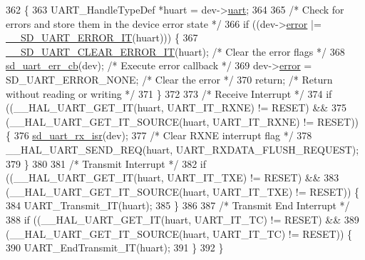 \begin{DoxyCode}
362 \{
363     UART\_HandleTypeDef *huart = dev->\mbox{\hyperlink{structsd__uart__dev_a31b2a452cffe839ac4a3bf86eddc16b0}{uart}};
364   
365     \textcolor{comment}{/* Check for errors and store them in the device error state */}
366     \textcolor{keywordflow}{if} ((dev->\mbox{\hyperlink{structsd__uart__dev_adc64ccb7538429fe78e3fe0139267370}{error}} |= \mbox{\hyperlink{group___s_d___u_a_r_t___defines_gaecb6d035303fa5bf3942fdfa3f78867f}{\_\_SD\_UART\_ERROR\_IT}}(huart))) \{
367         \mbox{\hyperlink{group___s_d___u_a_r_t___defines_ga2f7c7d01afb8822a032abc57a3bf78cf}{\_\_SD\_UART\_CLEAR\_ERROR\_IT}}(huart);    \textcolor{comment}{/* Clear the error flags */}
368         \mbox{\hyperlink{group___s_d___u_a_r_t_gafc595787c83c748d767ac49596be144e}{sd\_uart\_err\_cb}}(dev);          \textcolor{comment}{/* Execute error callback */}
369         dev->\mbox{\hyperlink{structsd__uart__dev_adc64ccb7538429fe78e3fe0139267370}{error}} = SD\_UART\_ERROR\_NONE;   \textcolor{comment}{/* Clear the error */}
370         \textcolor{keywordflow}{return};                     \textcolor{comment}{/* Return without reading or writing */}
371     \}
372 
373     \textcolor{comment}{/* Receive Interrupt */}
374     \textcolor{keywordflow}{if} ((\_\_HAL\_UART\_GET\_IT(huart, UART\_IT\_RXNE) != RESET) && 
375         (\_\_HAL\_UART\_GET\_IT\_SOURCE(huart, UART\_IT\_RXNE) != RESET)) \{
376         \mbox{\hyperlink{group___s_d___u_a_r_t_ga54b5b3ca4f31885d84714a36f6fcc5e3}{sd\_uart\_rx\_isr}}(dev);
377         \textcolor{comment}{/* Clear RXNE interrupt flag */}
378         \_\_HAL\_UART\_SEND\_REQ(huart, UART\_RXDATA\_FLUSH\_REQUEST);
379     \}
380        
381     \textcolor{comment}{/* Transmit Interrupt */}
382     \textcolor{keywordflow}{if} ((\_\_HAL\_UART\_GET\_IT(huart, UART\_IT\_TXE) != RESET) &&
383         (\_\_HAL\_UART\_GET\_IT\_SOURCE(huart, UART\_IT\_TXE) != RESET)) \{
384         UART\_Transmit\_IT(huart);
385     \}
386 
387     \textcolor{comment}{/* Transmit End Interrupt */}
388     \textcolor{keywordflow}{if} ((\_\_HAL\_UART\_GET\_IT(huart, UART\_IT\_TC) != RESET) &&
389         (\_\_HAL\_UART\_GET\_IT\_SOURCE(huart, UART\_IT\_TC) != RESET)) \{
390         UART\_EndTransmit\_IT(huart);
391     \}  
392 \}
\end{DoxyCode}
\mbox{\label{group___s_d___u_a_r_t___functions_ga92a2dfada8629938854ad2fddff0d01d}} 
